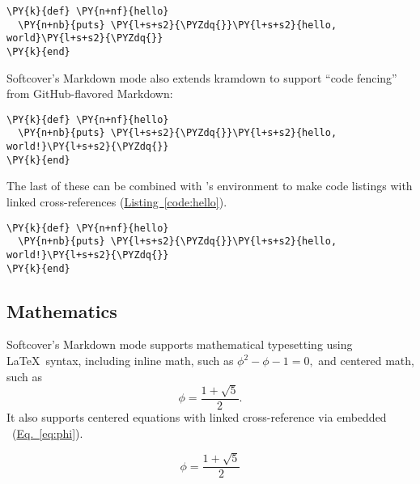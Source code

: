 \begin{framed_shaded}
\begin{Verbatim}[fontsize=\relsize{-2.5},fontseries=b,commandchars=\\\{\}]
\PY{k}{def} \PY{n+nf}{hello}
  \PY{n+nb}{puts} \PY{l+s+s2}{\PYZdq{}}\PY{l+s+s2}{hello, world}\PY{l+s+s2}{\PYZdq{}}
\PY{k}{end}
\end{Verbatim}
\end{framed_shaded}

Softcover's Markdown mode also extends kramdown to support ``code fencing'' from GitHub-flavored Markdown:

\begin{framed_shaded}
\begin{Verbatim}[fontsize=\relsize{-2.5},fontseries=b,commandchars=\\\{\}]
\PY{k}{def} \PY{n+nf}{hello}
  \PY{n+nb}{puts} \PY{l+s+s2}{\PYZdq{}}\PY{l+s+s2}{hello, world!}\PY{l+s+s2}{\PYZdq{}}
\PY{k}{end}
\end{Verbatim}
\end{framed_shaded}

The last of these can be combined with \PolyTeX's  environment to make code listings with linked cross-references (\hyperref[code:hello]{Listing~\ref{code:hello}}).

\begin{codelisting}
\label{code:hello}
\begin{Verbatim}[fontsize=\relsize{-2.5},fontseries=b,commandchars=\\\{\}]
\PY{k}{def} \PY{n+nf}{hello}
  \PY{n+nb}{puts} \PY{l+s+s2}{\PYZdq{}}\PY{l+s+s2}{hello, world!}\PY{l+s+s2}{\PYZdq{}}
\PY{k}{end}
\end{Verbatim}
\end{codelisting}

\subsection{Mathematics}

Softcover's Markdown mode supports mathematical typesetting using \LaTeX\ syntax, including inline math, such as \( \phi^2 - \phi - 1 = 0, \) and centered math, such as
\[ \phi = \frac{1+\sqrt{5}}{2}. \]
It also supports centered equations with linked cross-reference via embedded \PolyTeX\ (\hyperref[eq:phi]{Eq.~\eqref{eq:phi}}).

\begin{equation}
\label{eq:phi}
\phi = \frac{1+\sqrt{5}}{2}
\end{equation}

